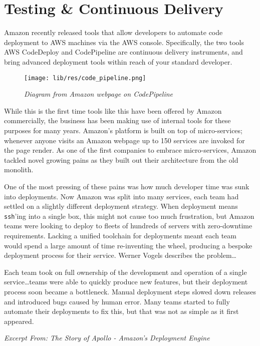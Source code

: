 \documentclass[11pt]{article}
\begin{document}
\section{Testing \& Continuous Delivery}

Amazon recently released tools that allow developers to automate code deployment
to AWS machines via the AWS console. Specifically, the two tools AWS CodeDeploy
and CodePipeline are continuous delivery instruments, and bring advanced
deployment tools within reach of your standard developer.

\begin{figure}
\centering
\texttt{[image: lib/res/code\_pipeline.png]}
\caption{\label{fig:scoping}\textit{Diagram from Amazon webpage on
CodePipeline}}
\end{figure}

While this is the first time tools like this have been offered by Amazon
commercially, the business has been making use of internal tools for these
purposes for many years. Amazon's platform is built on top of micro-services;
whenever anyone visits an Amazon webpage up to 150 services are invoked for the
page render. As one of the first companies to embrace micro-services, Amazon
tackled novel growing pains as they built out their architecture from the old
monolith.

One of the most pressing of these pains was how much developer time was sunk
into deployments. Now Amazon was split into many services, each team had settled
on a slightly different deployment strategy. When deployment means
\texttt{ssh}'ing into a single box, this might not cause too much frustration,
but Amazon teams were looking to deploy to fleets of hundreds of servers with
zero-downtime requirements. Lacking a unified toolchain for deployments meant
each team would spend a large amount of time re-inventing the wheel, producing a
bespoke deployment process for their service. Werner Vogels describes the
problem\dots

\begin{displayquote}

  Each team took on full ownership of the development and operation of a single
  service\dots teams were able to quickly produce new features, but their deployment
  process soon became a bottleneck. Manual deployment steps slowed down releases
  and introduced bugs caused by human error. Many teams started to fully
  automate their deployments to fix this, but that was not as simple as it first
  appeared.

  \textit{Excerpt From: The Story of Apollo - Amazon's Deployment
  Engine~\cite{theStoryOfApollo}}

\end{displayquote}
\end{document}
